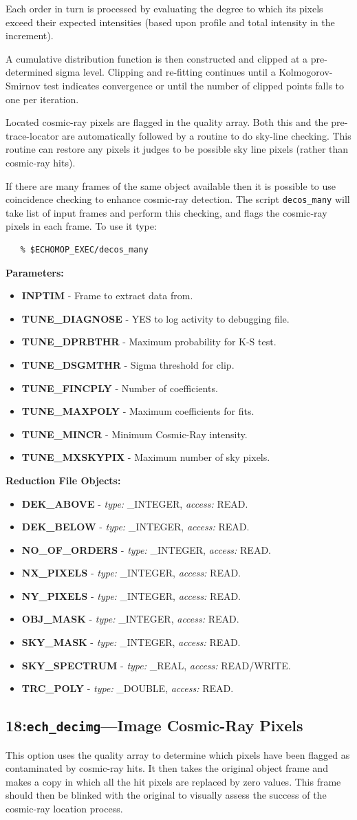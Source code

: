 \documentclass[11pt,twoside]{article}
\makeatletter
\newcommand{\stardocinitials}  {SUN}
\newcommand{\stardocnumber}    {152.4}
\newcommand{\stardocname}{\stardocinitials /\stardocnumber}
\newcommand{\htmlref}[2]{#1}
\newcommand{\xlabel}[1]{}
\newcommand{\myindex}[1]{\index{#1}}
\renewcommand{\myindex}[1]{}
\newcommand{\cmdname}{\begingroup \catcode`\_=12 \realcmdname}
\newcommand{\realcmdname}[1]{\endgroup\texttt{#1}}
\newlength{\sstbannerlength}
\newlength{\sstcaptionlength}
\newcommand{\echtask}[4]{
   \goodbreak
   \rule{\textwidth}{0.5mm}
   \vspace{-7ex}
   \newline
   \settowidth{\sstbannerlength}{{\Large {\bf #3}}}
   \setlength{\sstcaptionlength}{\textwidth}
   \addtolength{\sstbannerlength}{0.5em}
   \addtolength{\sstcaptionlength}{-2.0\sstbannerlength}
   \addtolength{\sstcaptionlength}{-5.0pt}
   \parbox[t]{\sstbannerlength}{\flushleft{\Large {\bf #3}}}
   \parbox[t]{\sstcaptionlength}{\center{\Large #4}}
   \parbox[t]{\sstbannerlength}{\flushright{\Large {\bf #3}}}
   \label{#1}\label{#2}
   \markboth{#3}{\stardocname}
   \uppercase{\myindex{#2@\protect\cmdname{#2}}}
}
\renewcommand{\echtask}[4]
{
  \subsection{\xlabel{#1}\xlabel{#2}\label{#1}\label{#2}#3---#4}
  \markboth{#3}{\stardocname}
}
\newcommand{\echpars}[1]{
{\bf Parameters:\vspace*{6pt}\\}
    #1
}
\renewcommand{\echpars}[1]{
{\bf Parameters:}
\begin{itemize}
#1
\end{itemize}
}
\newcommand{\epar}[3]
{
    \hspace*{5mm}\makebox[50mm][l]{\bf #1} #2 (p~\pageref{par_#3}.)\\
}
\renewcommand{\epar}[3]
{\item \htmlref{{\bf #1}}{par_#3} - #2}
\newcommand{\lepar}[3]
{
    \hspace*{5mm}\makebox[50mm][l]{\bf #1} #2 (p~\pageref{par_#3}.)
}
\renewcommand{\lepar}[3]
{\item \htmlref{{\bf #1}}{par_#3} - #2}
\newcommand{\echredobj}[1]{
{\bf Reduction File Objects:\vspace*{6pt}\\}
      \hspace*{5mm}\makebox[50mm][l]{Object}\makebox[25mm][l]{Type}{Access}\\
      #1
}
\renewcommand{\echredobj}[1]{
{\bf Reduction File Objects:}
\begin{itemize}
#1
\end{itemize}
}
\newcommand{\eobj}[3]
{
    \hspace*{5mm}\makebox[50mm][l]{\bf #1}\makebox[25mm][l]{\tt #2}{\tt #3}\\
}
\renewcommand{\eobj}[3]
{\item {\bf #1} - {\it type:} #2, {\it access:} #3.}
\newcommand{\leobj}[3]
{
    \hspace*{5mm}\makebox[50mm][l]{\bf #1}\makebox[25mm][l]{\tt #2}{\tt #3}
}
\renewcommand{\leobj}[3]
{\item {\bf #1} - {\it type:} #2, {\it access:} #3.}
\makeatother
\begin{document}
Each order in turn is processed by evaluating the degree to which its
pixels exceed their expected intensities (based upon profile and total
intensity in the increment).

A cumulative distribution function is then constructed and clipped at a
pre-determined sigma level. Clipping and re-fitting continues until a
Kolmogorov-Smirnov test indicates convergence or until the number of
clipped points falls to one per iteration.
\myindex{Data quality}
\myindex{Quality array}
Located cosmic-ray pixels are flagged in the quality array. Both this and
the pre-trace-locator are automatically followed by a routine to do
sky-line checking. This routine can restore any pixels it judges to be
possible sky line pixels (rather than cosmic-ray hits).
\myindex{Cosmic rays!coincidence checking}
If there are many frames of the same object available then it is possible
to use coincidence checking to enhance cosmic-ray detection. The script
{\tt decos\_many} will take list of input frames and perform this checking,
and flags the cosmic-ray pixels in each frame.  To use it type:

\begin{verbatim}
   % $ECHOMOP_EXEC/decos_many
\end{verbatim}

\echpars{
\epar{INPTIM}{Frame to extract data from.}{INPTIM}
\epar{TUNE\_DIAGNOSE}{YES to log activity to debugging file.}{TUNE_DIAGNOSE}
\epar{TUNE\_DPRBTHR}{Maximum probability for K-S test.}{TUNE_DPRBTHR}
\epar{TUNE\_DSGMTHR}{Sigma threshold for clip.}{TUNE_DSGMTHR}
\epar{TUNE\_FINCPLY}{Number of coefficients.}{TUNE_FINCPLY}
\epar{TUNE\_MAXPOLY}{Maximum coefficients for fits.}{TUNE_MAXPOLY}
\epar{TUNE\_MINCR}{Minimum Cosmic-Ray intensity.}{TUNE_MINCR}
\lepar{TUNE\_MXSKYPIX}{Maximum number of sky pixels.}{TUNE_MXSKYPIX}
}


\echredobj{
\eobj{DEK\_ABOVE}{\_INTEGER}{READ}
\eobj{DEK\_BELOW}{\_INTEGER}{READ}
\eobj{NO\_OF\_ORDERS}{\_INTEGER}{READ}
\eobj{NX\_PIXELS}{\_INTEGER}{READ}
\eobj{NY\_PIXELS}{\_INTEGER}{READ}
\eobj{OBJ\_MASK}{\_INTEGER}{READ}
\eobj{SKY\_MASK}{\_INTEGER}{READ}
\eobj{SKY\_SPECTRUM}{\_REAL}{READ/WRITE}
\leobj{TRC\_POLY}{\_DOUBLE}{READ}
}


\echtask{option18}{ech_decimg}{18:{\tt ech\_decimg}}{Image Cosmic-Ray Pixels}
\myindex{Cosmic rays!imaging}

This option uses the quality array to determine which pixels have been
flagged as contaminated by cosmic-ray hits. It then takes the original
object frame and makes a copy in which all the hit pixels are replaced by
zero values. This frame should then be blinked with the original to
visually assess the success of the cosmic-ray location process.
\end{document}
